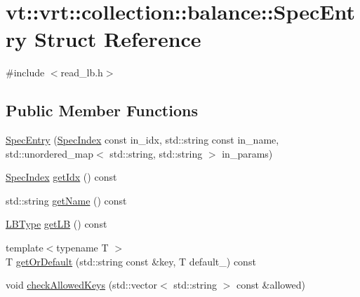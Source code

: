 \hypertarget{structvt_1_1vrt_1_1collection_1_1balance_1_1_spec_entry}{}\section{vt\+:\+:vrt\+:\+:collection\+:\+:balance\+:\+:Spec\+Entry Struct Reference}
\label{structvt_1_1vrt_1_1collection_1_1balance_1_1_spec_entry}


{\ttfamily \#include $<$read\+\_\+lb.\+h$>$}

\subsection*{Public Member Functions}
\begin{DoxyCompactItemize}
\item 
\hyperlink{structvt_1_1vrt_1_1collection_1_1balance_1_1_spec_entry_a69de4799079a46b5af62eccf974b7eef}{Spec\+Entry} (\hyperlink{namespacevt_1_1vrt_1_1collection_1_1balance_a72a5e0d9936ddf57f8e6c64e0e9fd123}{Spec\+Index} const in\+\_\+idx, std\+::string const in\+\_\+name, std\+::unordered\+\_\+map$<$ std\+::string, std\+::string $>$ in\+\_\+params)
\item 
\hyperlink{namespacevt_1_1vrt_1_1collection_1_1balance_a72a5e0d9936ddf57f8e6c64e0e9fd123}{Spec\+Index} \hyperlink{structvt_1_1vrt_1_1collection_1_1balance_1_1_spec_entry_a665d82dc37723e5392d215973eb1e73b}{get\+Idx} () const
\item 
std\+::string \hyperlink{structvt_1_1vrt_1_1collection_1_1balance_1_1_spec_entry_a1a6b18669456c0d4c9c311c63fd912c8}{get\+Name} () const
\item 
\hyperlink{namespacevt_1_1vrt_1_1collection_1_1balance_ac4f99693509affcc67db182d4aad9b5c}{L\+B\+Type} \hyperlink{structvt_1_1vrt_1_1collection_1_1balance_1_1_spec_entry_a265df7d1bc8ac20e92c7799fd4973018}{get\+LB} () const
\item 
{\footnotesize template$<$typename T $>$ }\\T \hyperlink{structvt_1_1vrt_1_1collection_1_1balance_1_1_spec_entry_ae5c35506e15c2123029d071a284b9367}{get\+Or\+Default} (std\+::string const \&key, T default\+\_\+) const
\item 
void \hyperlink{structvt_1_1vrt_1_1collection_1_1balance_1_1_spec_entry_a86ea05b64615f7be99e8db3baf195aae}{check\+Allowed\+Keys} (std\+::vector$<$ std\+::string $>$ const \&allowed)
\end{DoxyCompactItemize}
